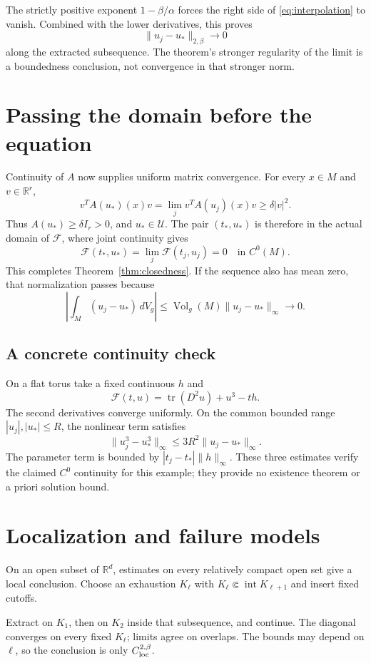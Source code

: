\documentclass[12pt,reqno]{amsart}
\begin{document}
The strictly positive exponent $1-\beta/\alpha$ forces the right side
of \eqref{eq:interpolation} to vanish. Combined with the lower derivatives,
this proves
\[
 \|u_j-u_*\|_{2,\beta}\longrightarrow0
\]
along the extracted subsequence. The theorem's stronger regularity of
the limit is a boundedness conclusion, not convergence in that stronger norm.

\section{Passing the domain before the equation}
Continuity of $A$ now supplies uniform matrix convergence. For every
$x\in M$ and $v\in\mathbb R^r$,
\[
 v^TA(u_*)(x)v=\lim_j v^TA(u_j)(x)v\geq\delta|v|^2.
\]
Thus $A(u_*)\geq\delta I_r>0$, and $u_*\in\mathcal U$. The pair
$(t_*,u_*)$ is therefore in the actual domain of $\mathcal F$, where
joint continuity gives
\[
 \mathcal F(t_*,u_*)=\lim_j\mathcal F(t_j,u_j)=0\quad\text{in }C^0(M).
\]
This completes Theorem~\ref{thm:closedness}. If the sequence also has
mean zero, that normalization passes because
\[
 \left|\int_M(u_j-u_*)\,dV_g\right|
 \leq\operatorname{Vol}_g(M)\|u_j-u_*\|_\infty\longrightarrow0.
\]

\subsection*{A concrete continuity check}
On a flat torus take a fixed continuous $h$ and
\[
 \mathcal F(t,u)=\operatorname{tr}(D^2u)+u^3-th.
\]
The second derivatives converge uniformly. On the common bounded range
$|u_j|,|u_*|\leq R$, the nonlinear term satisfies
\[
 \|u_j^3-u_*^3\|_\infty\leq3R^2\|u_j-u_*\|_\infty.
\]
The parameter term is bounded by $|t_j-t_*|\|h\|_\infty$.
These three estimates verify the claimed $C^0$ continuity for this
example; they provide no existence theorem or a priori solution bound.

\section{Localization and failure models}
On an open subset of $\mathbb R^d$, estimates on every relatively compact
open set give a local conclusion. Choose an exhaustion $K_\ell$ with
$K_\ell\Subset\operatorname{int}K_{\ell+1}$ and insert fixed cutoffs.

Extract on $K_1$, then on $K_2$ inside that subsequence, and continue.
The diagonal converges on every fixed $K_\ell$; limits agree on overlaps.
The bounds may depend on $\ell$, so the conclusion is only $C^{2,\beta}_{\rm loc}$.
\end{document}
